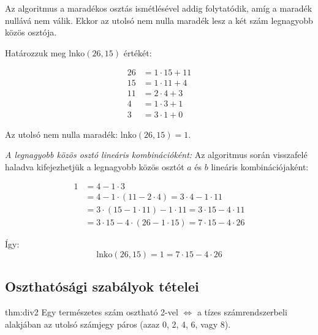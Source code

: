 Az algoritmus a maradékos osztás ismétlésével addig folytatódik, amíg
a maradék nullává nem válik. Ekkor az utolsó nem nulla maradék lesz
a két szám legnagyobb közös osztója.
\begin{example}
Határozzuk meg $\mathrm{lnko}(26,15)$ értékét:

\begin{align*}
26 & =1\cdot15+11\\
15 & =1\cdot11+4\\
11 & =2\cdot4+3\\
4 & =1\cdot3+1\\
3 & =3\cdot1+0
\end{align*}

Az utolsó nem nulla maradék: $\mathrm{lnko}(26,15)=1$.

\textit{A legnagyobb közös osztó lineáris kombinációként:} Az algoritmus
során visszafelé haladva kifejezhetjük a legnagyobb közös osztót $a$
és $b$ lineáris kombinációjaként:

\begin{align*}
1 & =4-1\cdot3\\
 & =4-1\cdot(11-2\cdot4)=3\cdot4-1\cdot11\\
 & =3\cdot(15-1\cdot11)-1\cdot11=3\cdot15-4\cdot11\\
 & =3\cdot15-4\cdot(26-1\cdot15)=7\cdot15-4\cdot26
\end{align*}

Így: 
\[
\mathrm{lnko}(26,15)=1=7\cdot15-4\cdot26
\]
\end{example}


\subsection*{Oszthatósági szabályok tételei}
\begin{theorem}{thm:div2}
Egy természetes szám osztható 2-vel $\iff$ a tízes számrendszerbeli
alakjában az utolsó számjegy páros (azaz 0, 2, 4, 6, vagy 8).
\end{theorem}

